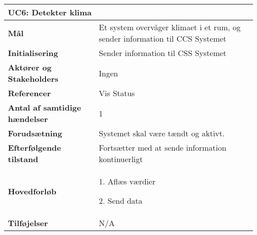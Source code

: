 \begin{table}[H] \centering
\begin{tabular}{|p{6cm}|p{8cm}|}
	\hline
\multicolumn{2}{|l|}{\textbf{UC6: Detekter klima}} \\\hline
\textbf{Mål} &
Et system overvåger klimaet i et rum, og sender information til CCS Systemet  \\\hline

\textbf{Initialisering} &
Sender information til CSS Systemet \\\hline
 
\textbf{Aktører og Stakeholders} &
Ingen \\\hline

\textbf{Referencer} &
Vis Status \\\hline

\textbf{Antal af samtidige hændelser} &
1 \\\hline

\textbf{Forudsætning} &
Systemet skal være tændt og aktivt. \\\hline

\textbf{Efterfølgende tilstand} &
Fortsætter med at sende information kontinuerligt \\\hline

\textbf{Hovedforløb} &
1. Aflæs værdier

2. Send data
  \\\hline

\textbf{Tilføjelser} &
N/A \\\hline
	\end{tabular}
	\label{UC6} 
\end{table}
